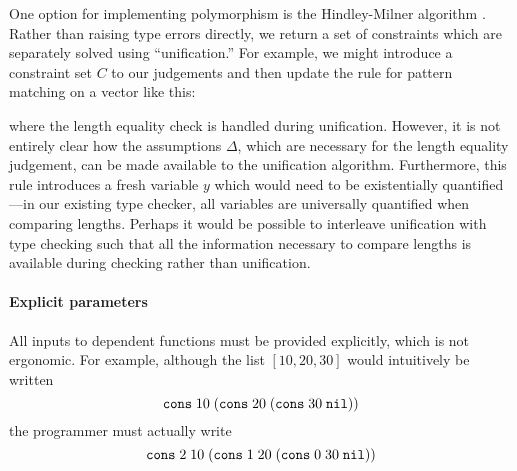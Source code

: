\documentclass[acmsmall,nonacm]{acmart}
\begin{document}
One option for implementing polymorphism is the Hindley-Milner algorithm \cite{comp523-lec-hm}.
Rather than raising type errors directly, we return a set of constraints which are separately solved using ``unification.''
For example, we might introduce a constraint set $C$ to our judgements and then update the rule for pattern matching on a vector like this:
\begin{inferences}
\end{inferences}
where the length equality check is handled during unification.
However, it is not entirely clear how the assumptions $\Delta$, which are necessary for the length equality judgement, can be made available to the unification algorithm.
Furthermore, this rule introduces a fresh variable $y$ which would need to be existentially quantified---in our existing type checker, all variables are universally quantified when comparing lengths.
Perhaps it would be possible to interleave unification with type checking such that all the information necessary to compare lengths is available during checking rather than unification.

\paragraph{Explicit parameters} \label{sec:limitations-implicit-params}
All inputs to dependent functions must be provided explicitly, which is not ergonomic.
For example, although the list $[10, 20, 30]$ would intuitively be written
\begin{equation*}
    \texttt{cons} \; 10 \; (\texttt{cons} \; 20 \; (\texttt{cons} \; 30 \; \texttt{nil}))
\end{equation*}
the programmer must actually write
\begin{equation*}
    \texttt{cons} \; 2 \; 10 \; (\texttt{cons} \; 1 \; 20 \; (\texttt{cons} \; 0 \; 30 \; \texttt{nil}))
\end{equation*}
\end{document}
